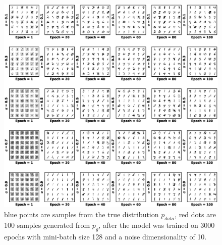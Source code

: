 \begin{figure}
	\includegraphics*[width=\textwidth]{./plots/MNIST_digits_evoling.eps}
	\caption{blue points are samples from the true distribution $p_{data}$, red dots are 100 samples generated from $p_g$, after the model was trained on 3000 epochs with mini-batch size 128 and a noise dimensionality of 10.}
	\label{fig:MNISTplots}
\end{figure}